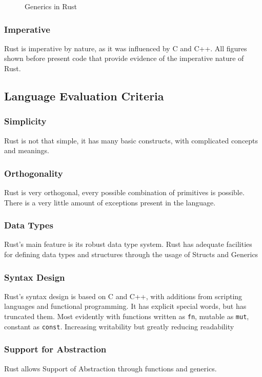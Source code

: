 \documentclass{article}
\newcommand{\rust}[1]{\inputminted{rust}{samples/rust/#1.rs}}
\newcommand{\rustin}[1]{\texttt{#1}}
\begin{document}
  \begin{figure}[ht]
    \rust{iterator}
    \caption{Generics in Rust}
    \label{fig:generic}
  \end{figure}


  \subsubsection{Imperative}
  Rust is imperative by nature, as it was influenced by C and C++. All figures
  shown before present code that provide evidence of the imperative nature of
  Rust.

  \subsection{Language Evaluation Criteria}

  \subsubsection{Simplicity}
  Rust is not that simple, it has many basic constructs, with
  complicated concepts and meanings.

  \subsubsection{Orthogonality}
  Rust is very orthogonal, every possible combination of primitives is possible.
  There is a very little amount of exceptions present in the language.

  \subsubsection{Data Types}
  Rust's main feature is its robust data type system. Rust has adequate
  facilities for defining data types and structures through the usage of Structs
  and Generics

  \subsubsection{Syntax Design}
  Rust's syntax design is based on C and C++, with additions from scripting
  languages and functional programming. It has explicit special words, but has
  truncated them. Most evidently with functions written as \rustin{fn}, mutable
  as \rustin{mut}, constant as \rustin{const}. Increasing writability but
  greatly reducing readability

  \subsubsection{Support for Abstraction}
  Rust allows Support of Abstraction through functions and generics.
\end{document}
